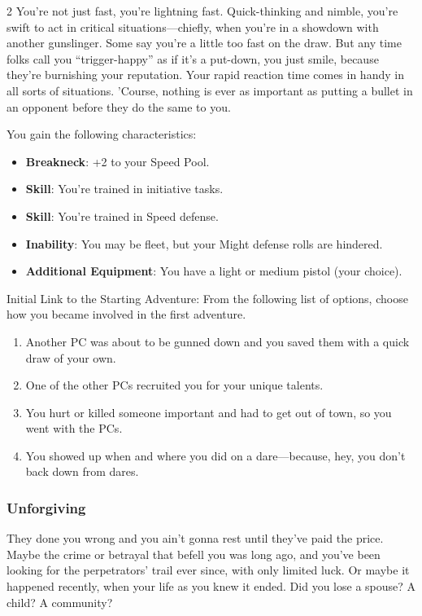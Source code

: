 \begin{multicols}{2}
You’re not just fast, you’re lightning fast. Quick-thinking and nimble, you’re swift to act in critical situations—chiefly, when you’re in a showdown with another gunslinger. Some say you’re a little too fast on the draw. But any time folks call you “trigger-happy” as if it’s a put-down, you just smile, because they’re burnishing your reputation. Your rapid reaction time comes in handy in all sorts of situations. ’Course, nothing is ever as important as putting a bullet in an opponent before they do the same to you.

You gain the following characteristics: 

\begin{itemize}
\item \textbf{Breakneck}: +2 to your Speed Pool. 
\item \textbf{Skill}: You’re trained in initiative tasks. 
\item \textbf{Skill}: You’re trained in Speed defense. 
\item \textbf{Inability}: You may be fleet, but your Might defense rolls are hindered. 
\item \textbf{Additional Equipment}: You have a light or medium pistol (your choice). 
\end{itemize}

Initial Link to the Starting Adventure: From the following list of options, choose how you became involved in the first adventure. 

\begin{enumerate}
\item Another PC was about to be gunned down and you saved them with a quick draw of your own. 
\item One of the other PCs recruited you for your unique talents. 
\item You hurt or killed someone important and had to get out of town, so you went with the PCs. 
\item You showed up when and where you did on a dare—because, hey, you don’t back down from dares.
\end{enumerate}

\subsubsection{Unforgiving}

They done you wrong and you ain’t gonna rest until they’ve paid the price. Maybe the crime or betrayal that befell you was long ago, and you’ve been looking for the perpetrators’ trail ever since, with only limited luck. Or maybe it happened recently, when your life as you knew it ended. Did you lose a spouse? A child? A community? 


\end{multicols}

